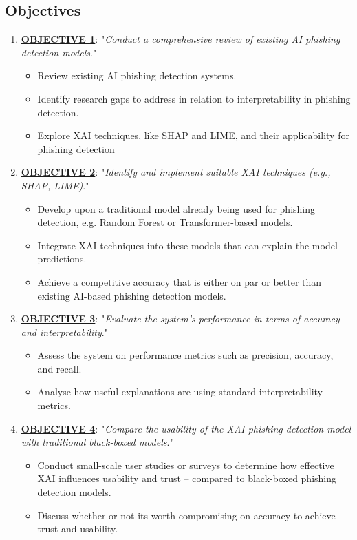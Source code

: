 
\subsection{Objectives}

\begin{enumerate}
  \item \uline{\textbf{OBJECTIVE 1}}: "\textit{Conduct a comprehensive review of existing AI phishing detection models}.\label{objective-1}"
  \begin{itemize}
    \item Review existing AI phishing detection systems.
    \item Identify research gaps to address in relation to interpretability in phishing detection.
    \item Explore XAI techniques, like SHAP and LIME, and their applicability for phishing detection
    \end{itemize}
  \item \uline{\textbf{OBJECTIVE 2}}: "\textit{Identify and implement suitable XAI techniques (e.g., SHAP, LIME)}.\label{objective-2}"
  \begin{itemize}
    \item Develop upon a traditional model already being used for phishing detection, e.g. Random Forest or Transformer-based models.
    \item Integrate XAI techniques into these models that can explain the model predictions.
    \item Achieve a competitive accuracy that is either on par or better than existing AI-based phishing detection models.
  \end{itemize}
\item \uline{\textbf{OBJECTIVE 3}}: "\textit{Evaluate the system's performance in terms of accuracy and interpretability}.\label{objective-3}"
  \begin{itemize}
    \item Assess the system on performance metrics such as precision, accuracy, and recall.
    \item Analyse how useful explanations are using standard interpretability metrics.
  \end{itemize}
\item \uline{\textbf{OBJECTIVE 4}}: "\textit{Compare the usability of the XAI phishing detection model with traditional black-boxed models}.\label{objective-4}"
  \begin{itemize}
    \item Conduct small-scale user studies or surveys to determine how effective XAI influences usability and trust -- compared to black-boxed phishing detection models.
    \item Discuss whether or not its worth compromising on accuracy to achieve trust and usability.
  \end{itemize}
\end{enumerate}
